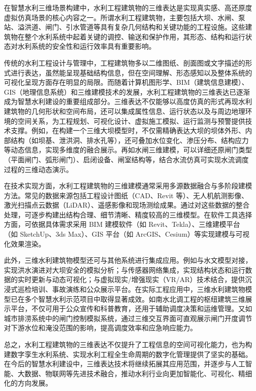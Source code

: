 在智慧水利三维场景构建中，水利工程建筑物的三维表达是实现真实感、高还原度虚拟仿真场景的核心内容之一。所谓水利工程建筑物，主要包括大坝、水闸、泵站、溢洪道、闸门、引水管道等具有复杂几何结构和关键功能的工程设施。这些建筑物在整个水利系统中起着关键的调控、输送和保护作用，其形态、结构和运行状态对水利系统的安全性和运行效率具有重要影响。

传统的水利工程设计与管理中，工程建筑物多以二维图纸、剖面图或文字描述的形式进行表达，虽然能呈现基础结构信息，但在空间理解、形态感知以及整体系统的可视化呈现方面存在明显的局限。而随着计算机图形学、BIM（建筑信息建模）、GIS（地理信息系统）和三维建模技术的发展，水利工程建筑物的三维表达已逐渐成为智慧水利建设的重要组成部分。三维表达不仅能够以高度仿真的形式再现水利建筑物的几何形状和空间布局，还可以集成属性信息、运行状态以及与周边地理环境的空间关系，为工程规划、可视化设计、虚拟施工模拟、运行监测与预警提供技术支撑。例如，在构建一个三维大坝模型时，不仅需精确表达大坝的坝体外形、内部结构（如坝基、泄洪洞、排水孔等），还可叠加水位变化、渗压分布、结构应力等动态信息，实现多维度的融合展示。再如水闸三维建模，可以详细还原闸门类型（平面闸门、弧形闸门）、启闭设备、闸室结构等，结合水流仿真可实现水流调度过程的三维动态演示。

在技术实现方面，水利工程建筑物的三维建模通常采用多源数据融合与多阶段建模方法。常见的数据来源包括工程设计图纸（CAD、Revit 等）、无人机航测影像、激光扫描点云数据（LiDAR）、遥感影像和现场测绘成果。通过对这些数据的整合处理，可逐步构建出结构合理、细节清晰、精度较高的三维模型。在软件工具选择方面，可依据具体需求采用 BIM 建模软件（如 Revit、Tekla）、三维建模平台（如 SketchUp、3ds Max）、GIS 平台（如 ArcGIS、Cesium）等实现建模与可视化效果渲染。

此外，三维水利建筑物模型还可与其他系统进行集成应用。例如与水文模型对接，实现洪水演进对大坝安全的模拟分析；与传感器网络集成，实现结构状态和运行数据的实时更新与动态可视化；与虚拟现实/增强现实（VR/AR）技术结合，提供沉浸式巡检培训、事故演练和公众展示平台。在实际工程应用中，三维水利建筑物模型已在多个智慧水利示范项目中取得显著成效。如南水北调工程的枢纽建筑三维展示平台，不仅可用于公众宣传和科普教育，还用于辅助调度决策和运维管理。又如城市排涝系统中的闸门控制模拟系统，通过三维交互界面可直观展示闸门开度调节对下游水位和淹没范围的影响，提高调度效率和应急响应能力。

总之，水利工程建筑物的三维表达不仅提升了工程信息的空间可视化能力，也为构建数字孪生水利系统、实现水利工程全生命周期的数字化管理提供了坚实的基础。在今后的智慧水利建设中，三维表达技术将继续拓展其应用范围，并逐步与人工智能、大数据、物联网等先进技术融合，推动水利行业向更加智能化、可视化、精细化的方向发展。

